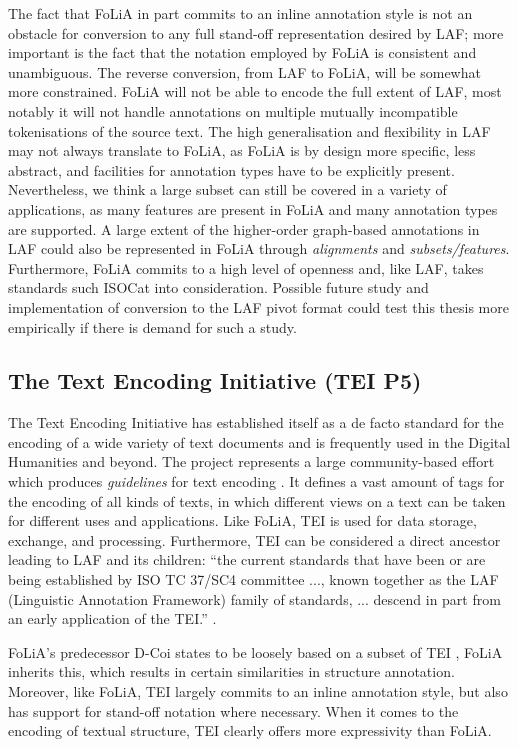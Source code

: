 \documentclass[a4paper,10pt,twoside]{article}
\begin{document}
The fact that FoLiA in part commits to an inline annotation style is not an
obstacle for conversion to any full stand-off representation desired by LAF;
more important is the fact that the notation employed by FoLiA is consistent
and unambiguous. The reverse conversion, from LAF to FoLiA, will be somewhat more
constrained. FoLiA will not be able to encode the full extent of LAF, most
notably it will not handle annotations on multiple mutually incompatible
tokenisations of the source text. The high generalisation and flexibility in
LAF may not always translate to FoLiA, as FoLiA is by design more specific,
less abstract, and facilities for annotation types have to be explicitly
present. Nevertheless, we think a large subset can still be covered in a
variety of applications, as many features are present in FoLiA and many
annotation types are supported. A large extent of the higher-order graph-based
annotations in LAF could also be represented in FoLiA through
\emph{alignments} and \emph{subsets/features}. Furthermore, FoLiA commits to a
high level of openness and, like LAF, takes standards such ISOCat \cite{ISOCAT} into
consideration. Possible future study and implementation of conversion to the LAF pivot format could test this thesis more
empirically if there is demand for such a study.

\subsection{The Text Encoding Initiative (TEI P5)}

The Text Encoding Initiative has established itself as a de facto standard for
the encoding of a wide variety of text documents and is frequently used in the
Digital Humanities and beyond. The project represents a large community-based
effort which produces \emph{guidelines} for text encoding \cite{TEI}. It
defines a vast amount of tags for the encoding of all kinds of texts, in which
different views on a text can be taken for different uses and applications.
Like FoLiA, TEI is used for data storage, exchange, and processing.
Furthermore, TEI can be considered a direct ancestor leading to LAF and its
children: ``the current standards that have been or are being established by ISO
TC 37/SC4 committee ..., known together as the LAF (Linguistic Annotation Framework) family of standards, ... descend
in part from an early application of the TEI.'' \cite{TEICORPUSANNOT}. 

FoLiA's predecessor D-Coi states to be loosely based on a subset of TEI
\cite{DCOI}, FoLiA inherits this, which results in certain similarities in
structure annotation. Moreover, like FoLiA, TEI largely commits to an inline
annotation style, but also has support for stand-off notation where necessary.
When it comes to the encoding of textual structure, TEI clearly offers more
expressivity than FoLiA. 
\end{document}
